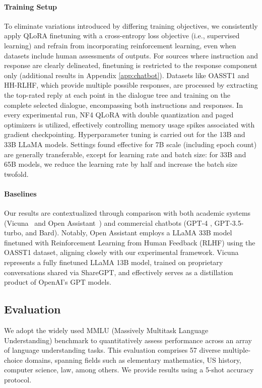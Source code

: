 \paragraph{Training Setup} To eliminate variations introduced by differing training objectives, we consistently apply QLoRA finetuning with a cross-entropy loss objective (i.e., supervised learning) and refrain from incorporating reinforcement learning, even when datasets include human assessments of outputs. For sources where instruction and response are clearly delineated, finetuning is restricted to the response component only (additional results in Appendix \ref{app:chatbot}). Datasets like OASST1 and HH-RLHF, which provide multiple possible responses, are processed by extracting the top-rated reply at each point in the dialogue tree and training on the complete selected dialogue, encompassing both instructions and responses. In every experimental run, NF4 \textsc{QLoRA} with double quantization and paged optimizers is utilized, effectively controlling memory usage spikes associated with gradient checkpointing. Hyperparameter tuning is carried out for the 13B and 33B LLaMA models. Settings found effective for 7B scale (including epoch count) are generally transferable, except for learning rate and batch size: for 33B and 65B models, we reduce the learning rate by half and increase the batch size twofold.

\paragraph{Baselines} Our results are contextualized through comparison with both academic systems (Vicuna~\citep{vicuna2023} and Open Assistant~\citep{kopf2023openassistant}) and commercial chatbots (GPT-4 \citep{openai2023gpt}, GPT-3.5-turbo, and Bard). Notably, Open Assistant employs a LLaMA 33B model finetuned with Reinforcement Learning from Human Feedback (RLHF) using the OASST1 dataset, aligning closely with our experimental framework. Vicuna represents a fully finetuned LLaMA 13B model, trained on proprietary conversations shared via ShareGPT, and effectively serves as a distillation product of OpenAI’s GPT models.

\subsection{Evaluation}

We adopt the widely used MMLU (Massively Multitask Language Understanding) benchmark \citep{hendrycksmeasuring} to quantitatively assess performance across an array of language understanding tasks. This evaluation comprises 57 diverse multiple-choice domains, spanning fields such as elementary mathematics, US history, computer science, law, among others. We provide results using a 5-shot accuracy protocol.

